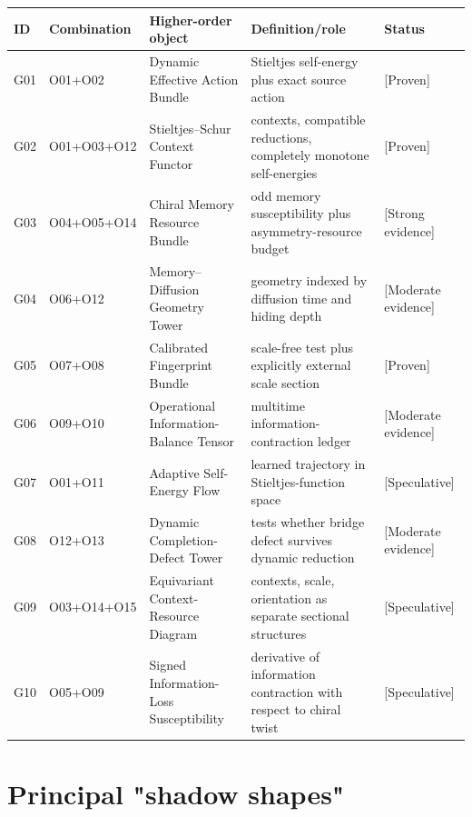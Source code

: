 \documentclass[11pt,a4paper,openany]{report}
\newcommand{\statusProven}{\textcolor{fingreen}{[Proven]}}
\newcommand{\statusStrong}{\textcolor{finblue}{[Strong evidence]}}
\newcommand{\statusModerate}{\textcolor{finviolet}{[Moderate evidence]}}
\newcommand{\statusSpeculative}{\textcolor{finorange}{[Speculative]}}
\begin{document}
\begin{center}
\begingroup\fontsize{7}{8.4}\selectfont
\setlength{\tabcolsep}{2.5pt}
\renewcommand{\arraystretch}{1.16}
\begin{longtable}{@{}p{}p{}p{}p{}p{}@{}}
\toprule
\textbf{ID} & \textbf{Combination} & \textbf{Higher-order object} & \textbf{Definition/\allowbreak{}role} & \textbf{Status} \\
\midrule
\endhead
G01 & O01+O02 & Dynamic Effective Action Bundle & Stieltjes self-energy plus exact source action & \statusProven{} \\
G02 & O01+O03+O12 & Stieltjes--Schur Context Functor & contexts, compatible reductions, completely monotone self-energies & \statusProven{} \\
G03 & O04+O05+O14 & Chiral Memory Resource Bundle & odd memory susceptibility plus asymmetry-resource budget & \statusStrong{} \\
G04 & O06+O12 & Memory--Diffusion Geometry Tower & geometry indexed by diffusion time and hiding depth & \statusModerate{} \\
G05 & O07+O08 & Calibrated Fingerprint Bundle & scale-free test plus explicitly external scale section & \statusProven{} \\
G06 & O09+O10 & Operational Information-Balance Tensor & multitime information-contraction ledger & \statusModerate{} \\
G07 & O01+O11 & Adaptive Self-Energy Flow & learned trajectory in Stieltjes-function space & \statusSpeculative{} \\
G08 & O12+O13 & Dynamic Completion-Defect Tower & tests whether bridge defect survives dynamic reduction & \statusModerate{} \\
G09 & O03+O14+O15 & Equivariant Context-Resource Diagram & contexts, scale, orientation as separate sectional structures & \statusSpeculative{} \\
G10 & O05+O09 & Signed Information-Loss Susceptibility & derivative of information contraction with respect to chiral twist & \statusSpeculative{} \\
\bottomrule
\end{longtable}
\endgroup
\end{center}

\chapter{Principal "shadow shapes"}
\end{document}
